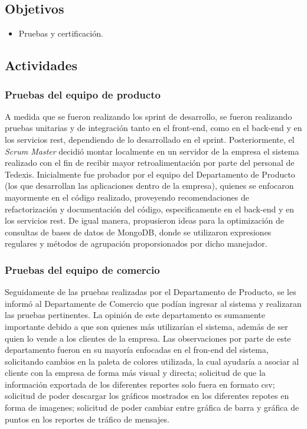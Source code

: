 \subsection{Objetivos}
\begin{itemize}[noitemsep,nolistsep]
\item Pruebas y certificación. 
\end{itemize}

\subsection{Actividades}

\subsubsection{Pruebas del equipo de producto}

\indent A medida que se fueron realizando los sprint de desarrollo, se fueron realizando pruebas unitarias y de integración tanto en el front-end, como en el back-end y en los servicios rest, dependiendo de lo desarrollado en el sprint.
\newline
\newline
\indent Posteriormente, el \textit{Scrum Master} decidió montar localmente en un servidor de la empresa el sistema realizado con el fin de recibir mayor retroalimentación por parte del personal de Tedexis. Inicialmente fue probador por el equipo del Departamento de Producto (los que desarrollan las aplicaciones dentro de la empresa), quienes se enfocaron mayormente en el código realizado, proveyendo recomendaciones de refactorización y documentación del código, especificamente en el back-end y en los servicios rest. De igual manera, propusieron ideas para la optimización de consultas de bases de datos de MongoDB, donde se utilizaron expresiones regulares y métodos de agrupación proporsionados por dicho manejador.

\subsubsection{Pruebas del equipo de comercio}

\indent Seguidamente de las pruebas realizadas por el Departamento de Producto, se les informó al Departamente de Comercio que podían ingresar al sistema y realizaran las pruebas pertinentes. La opinión de este departamento es sumamente importante debido a que son quienes más utilizarían el sistema, además de ser quien lo vende a los clientes de la empresa.
\newline
\newline
\indent Las observaciones por parte de este departamento fueron en su mayoría enfocadas en el fron-end del sistema, solicitando cambios en la paleta de colores utilizada, la cual ayudaría a asociar al cliente con la empresa de forma más visual y directa; solicitud de que la información exportada de los diferentes reportes solo fuera en formato csv; solicitud de poder descargar los gráficos mostrados en los diferentes repotes en forma de imagenes; solicitud de poder cambiar entre gráfica de barra y gráfica de puntos en los reportes de tráfico de mensajes.

